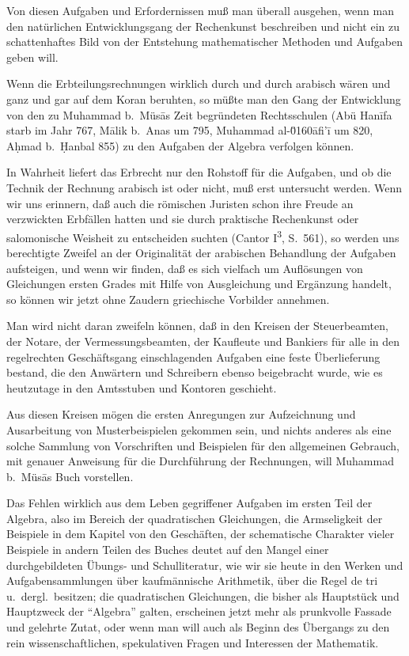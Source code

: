 \documentclass[11pt,a4paper]{article}
\newcommand{\enquote}[1]{``#1''}
\begin{document}
Von diesen Aufgaben und Erfordernissen mu\ss{} man \"uberall ausgehen, wenn man den nat\"urlichen Entwicklungsgang der Rechenkunst beschreiben und nicht ein zu schattenhaftes Bild von der Entstehung mathematischer Methoden und Aufgaben geben will.

Wenn die Erbteilungsrechnungen wirklich durch und durch arabisch w\"aren und ganz und gar auf dem Koran beruhten, so m\"u\ss{}te man den Gang der Entwicklung von den zu Muhammad b.\ M\"us\=as Zeit begr\"undeten Rechtsschulen (Ab\"u Han\={i}fa starb im Jahr 767, M\=alik b.\ Anas um 795, Muhammad al-\u0160\=afi'\={i} um 820, A\d{h}mad b.\ \d{H}anbal 855) zu den Aufgaben der Algebra verfolgen k\"onnen.

In Wahrheit liefert das Erbrecht nur den Rohstoff f\"ur die Aufgaben, und ob die Technik der Rechnung arabisch ist oder nicht, mu\ss{} erst untersucht werden. Wenn wir uns erinnern, da\ss{} auch die r\"omischen Juristen schon ihre Freude an verzwickten Erbf\"allen hatten und sie durch praktische Rechenkunst oder salomonische Weisheit zu entscheiden suchten (Cantor I\textsuperscript{3}, S.\ 561), so werden uns berechtigte Zweifel an der Originalit\"at der arabischen Behandlung der Aufgaben aufsteigen, und wenn wir finden, da\ss{} es sich vielfach um Aufl\"osungen von Gleichungen ersten Grades mit Hilfe von Ausgleichung und Erg\"anzung handelt, so k\"onnen wir jetzt ohne Zaudern griechische Vorbilder annehmen.

Man wird nicht daran zweifeln k\"onnen, da\ss{} in den Kreisen der Steuerbeamten, der Notare, der Vermessungsbeamten, der Kaufleute und Bankiers f\"ur alle in den regelrechten Gesch\"aftsgang einschlagenden Aufgaben eine feste \"Uberlieferung bestand, die den Anw\"artern und Schreibern ebenso beigebracht wurde, wie es heutzutage in den Amtsstuben und Kontoren geschieht.

Aus diesen Kreisen m\"ogen die ersten Anregungen zur Aufzeichnung und Ausarbeitung von Musterbeispielen gekommen sein, und nichts anderes als eine solche Sammlung von Vorschriften und Beispielen f\"ur den allgemeinen Gebrauch, mit genauer Anweisung f\"ur die Durchf\"uhrung der Rechnungen, will Muhammad b.\ M\"us\=as Buch vorstellen.

Das Fehlen wirklich aus dem Leben gegriffener Aufgaben im ersten Teil der Algebra, also im Bereich der quadratischen Gleichungen, die Armseligkeit der Beispiele in dem Kapitel von den Gesch\"aften, der schematische Charakter vieler Beispiele in andern Teilen des Buches deutet auf den Mangel einer durchgebildeten \"Ubungs- und Schulliteratur, wie wir sie heute in den Werken und Aufgabensammlungen \"uber kaufm\"annische Arithmetik, \"uber die Regel de tri u.\ dergl.\ besitzen; die quadratischen Gleichungen, die bisher als Hauptst\"uck und Hauptzweck der \enquote{Algebra} galten, erscheinen jetzt mehr als prunkvolle Fassade und gelehrte Zutat, oder wenn man will auch als Beginn des \"Ubergangs zu den rein wissenschaftlichen, spekulativen Fragen und Interessen der Mathematik.
\end{document}
